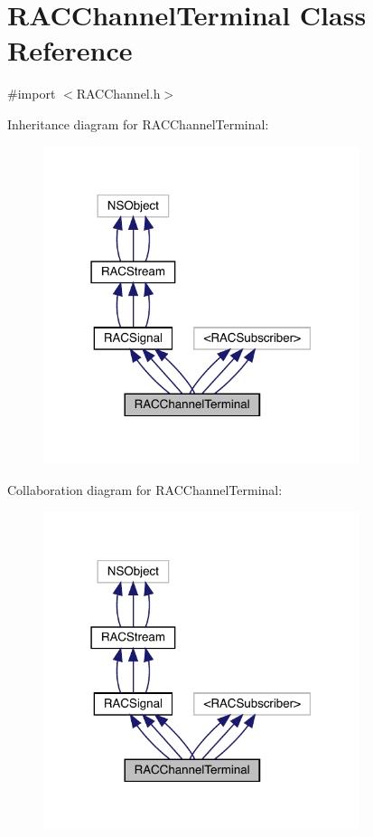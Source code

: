 \hypertarget{interface_r_a_c_channel_terminal}{}\section{R\+A\+C\+Channel\+Terminal Class Reference}
\label{interface_r_a_c_channel_terminal}


{\ttfamily \#import $<$R\+A\+C\+Channel.\+h$>$}



Inheritance diagram for R\+A\+C\+Channel\+Terminal\+:\nopagebreak
\begin{figure}[H]
\begin{center}
\leavevmode
\includegraphics[width=262pt]{interface_r_a_c_channel_terminal__inherit__graph}
\end{center}
\end{figure}


Collaboration diagram for R\+A\+C\+Channel\+Terminal\+:\nopagebreak
\begin{figure}[H]
\begin{center}
\leavevmode
\includegraphics[width=262pt]{interface_r_a_c_channel_terminal__coll__graph}
\end{center}
\end{figure}
